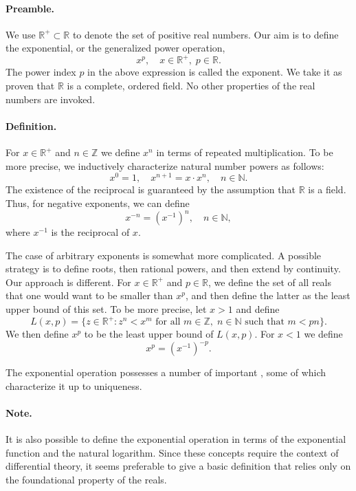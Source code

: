 \documentclass[12pt]{article}
\newcommand{\reals}{\mathbb{R}}
\newcommand{\natnums}{\mathbb{N}}
\newcommand{\znums}{\mathbb{Z}}
\begin{document}
\paragraph{Preamble.}  We use $\reals^+\subset\reals$ to denote the set of
positive real numbers. Our aim is to define the exponential, or
the generalized power operation,  
$$x^p,\quad x\in\reals^+,\; p\in\reals.$$
The power index $p$ in the above
expression is called the exponent. We take it as proven that $\reals$
is a complete, ordered field.  No other properties of the real numbers
are invoked.

\paragraph{Definition.}
For $x\in\reals^+$ and $n\in\znums$ we define $x^n$ in terms of
repeated multiplication.  To be more precise, we inductively
characterize natural number powers as follows:
$$x^0 = 1,\quad x^{n+1} = x\cdot x^n,\quad n\in\natnums.$$
The existence of the
reciprocal is guaranteed by the assumption that $\reals$ is a field.
Thus, for negative exponents, we can define
$$x^{-n} = (x^{-1})^n,\quad n\in\natnums,$$
where $x^{-1}$ is the reciprocal of $x$.

The case of arbitrary exponents is somewhat more complicated.  A
possible strategy is to define roots, then rational powers, and then
extend by continuity.  Our approach is different.  For $x\in\reals^+$
and $p\in \reals$, we define the set of all reals that one would want
to be smaller than $x^p$, and then define the latter as the least
upper bound of this set.  To be more precise, let $x>1$ and define
$$L(x,p)=\{ z\in\reals^+: z^n<x^m \text{ for all } m\in\znums,\; n\in
\natnums \text{ such that } m<pn\}.$$
We then define $x^p$ to be the least upper bound of $L(x,p)$.
For $x<1$ we define  
$$x^p = (x^{-1})^{-p}.$$



The exponential operation possesses a number of
important ,
some of which characterize it up to uniqueness.


\paragraph{Note.} It is also possible to define the exponential operation in
terms of the exponential function and the natural logarithm. Since these concepts require
the context of
differential theory, it seems preferable to give a basic definition
that relies only on the foundational property of the reals.
\end{document}

